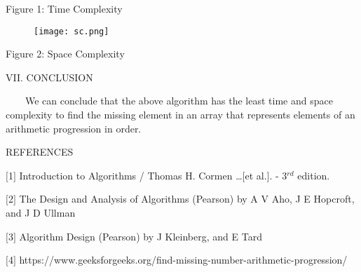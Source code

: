 \documentclass[12pt,a4paper]{article}
\begin{document}
\begin{multicols}{2}
\begin{center}Figure 1: Time Complexity\end{center}


\end{multicols}
\begin{figure}[h]
\centering
\texttt{[image: sc.png]}
\end{figure}

\begin{multicols}{2}
\begin{center}Figure 2: Space Complexity\end{center}





\begin{center}VII. CONCLUSION\end{center}

\ \ \ \ We can conclude that the above algorithm has the least time and space 
complexity to find the missing element in an array that represents elements of an arithmetic progression in order.


\begin{center}REFERENCES\end{center}

$[$1$]$ Introduction to Algorithms / Thomas H. Cormen \ldots $[$et 
al.$]$. - 3$^{rd}$ edition.

$[$2$]$ The Design and Analysis of Algorithms (Pearson) by A V Aho, J E 
Hopcroft, and J D Ullman 

$[$3$]$ Algorithm Design (Pearson) by J Kleinberg, and E Tard

$[$4$]$ https://www.geeksforgeeks.org/find-missing-number-arithmetic-progression/

\end{multicols}
\end{document}
